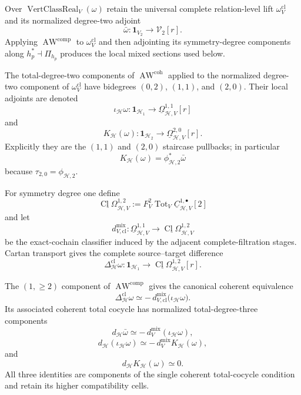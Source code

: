 Over $\operatorname{VertClassReal}_V(\omega)$ retain the universal complete
relation-level lift $\omega_V^{\mathrm{cl}}$ and its normalized degree-two
adjoint
\[
\bar\omega:
\mathbf1_{V_2}\longrightarrow\mathcal V_2[r].
\]
Applying $\operatorname{AW}^{\mathrm{comp}}$ to
$\omega_V^{\mathrm{cl}}$ and then adjointing its symmetry-degree components along
$h_p^*\dashv\Pi_{h_p}$ produces the local mixed sections used below.

\begin{construction}
\label{constr:prequantum-ordered-hamiltonian-contraction}
The total-degree-two components of $\operatorname{AW}^{\mathrm{coh}}$ applied to
the normalized degree-two component of $\omega_V^{\mathrm{cl}}$ have bidegrees
$(0,2)$, $(1,1)$, and $(2,0)$.  Their local adjoints are denoted
\[
\boxed{
\iota_{\mathcal H}\omega:
\mathbf1_{\mathcal H_1}
\longrightarrow
\underline\Omega^{1,1}_{\mathcal H,V}[r]
}
\]
and
\[
\boxed{
K_{\mathcal H}(\omega):
\mathbf1_{\mathcal H_2}
\longrightarrow
\underline\Omega^{2,0}_{\mathcal H,V}[r].
}
\]
Explicitly they are the $(1,1)$ and $(2,0)$ staircase pullbacks; in particular
\[
K_{\mathcal H}(\omega)
=\phi_{\mathcal H,2}^*\bar\omega
\]
because $\tau_{2,0}=\phi_{\mathcal H,2}$.
\end{construction}

For symmetry degree one define
\[
\underline{\operatorname{Cl}\Omega}^{1,2}_{\mathcal H,V}
:=
F_V^2\operatorname{Tot}_V
\underline C^{1,\bullet}_{\mathcal H,V}[2]
\]
and let
\[
d^{\mathrm{mix}}_{V,\mathrm{cl}}:
\underline\Omega^{1,1}_{\mathcal H,V}
\longrightarrow
\underline{\operatorname{Cl}\Omega}^{1,2}_{\mathcal H,V}
\]
be the exact-cochain classifier induced by the adjacent complete-filtration
stages.  Cartan transport gives the complete source--target difference
\[
\Delta^{\mathrm{cl}}_{\mathcal H}\omega:
\mathbf1_{\mathcal H_1}
\longrightarrow
\underline{\operatorname{Cl}\Omega}^{1,2}_{\mathcal H,V}[r].
\]

\begin{theorem}
\label{thm:prequantum-ordered-mixed-prism-identities}
The $(1,\ge2)$ component of
$\operatorname{AW}^{\mathrm{comp}}$ gives the canonical coherent equivalence
\[
\boxed{
\Delta^{\mathrm{cl}}_{\mathcal H}\omega
\simeq
-\,d^{\mathrm{mix}}_{V,\mathrm{cl}}
\bigl(\iota_{\mathcal H}\omega\bigr).
}
\]
Its associated coherent total cocycle has normalized total-degree-three
components
\[
\boxed{
d_{\mathcal H}\bar\omega
\simeq
-\,d_V^{\mathrm{mix}}
(\iota_{\mathcal H}\omega),
}
\]
\[
\boxed{
d_{\mathcal H}(\iota_{\mathcal H}\omega)
\simeq
-\,d_V^{\mathrm{mix}}K_{\mathcal H}(\omega),
}
\]
and
\[
\boxed{
d_{\mathcal H}K_{\mathcal H}(\omega)\simeq0.
}
\]
All three identities are components of the single coherent total-cocycle
condition and retain its higher compatibility cells.
\end{theorem}

